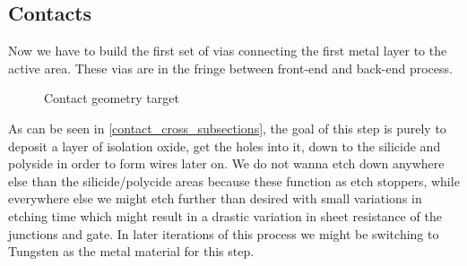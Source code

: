 \subsection{Contacts}\label{chapter_contact}

Now we have to build the first set of vias connecting the first metal layer to the active area.
These vias are in the fringe between front-end and back-end process.

\begin{figure}[H]
	\centering
	\begin{tikzpicture}[node distance = 3cm, auto, thick,scale=\CrossAndTopSectionBig, every node/.style={transform shape}]
		
	\end{tikzpicture}
	\caption{Contact geometry target}
	\label{contact_cross_subsections}
\end{figure}

As can be seen in \autoref{contact_cross_subsections}, the goal of this step is purely to deposit a layer of isolation oxide, get the holes into it, down to the silicide and polyside in order to form wires later on.
We do not wanna etch down anywhere else than the silicide/polycide areas because these function as etch stoppers, while everywhere else we might etch further than desired with small variations in etching time which might result in a drastic variation in sheet resistance of the junctions and gate.
In later iterations of this process we might be switching to Tungsten as the metal material for this step.
